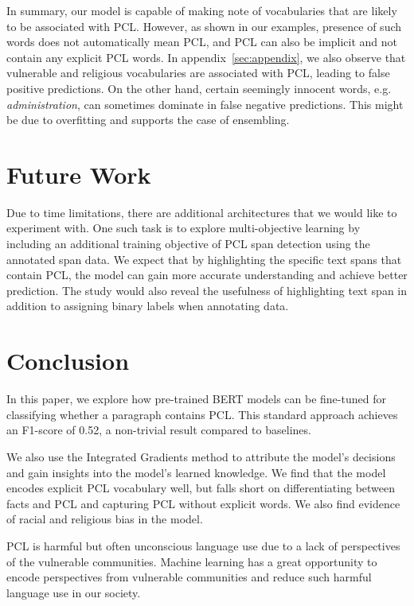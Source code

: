 \documentclass[11pt]{article}
\begin{document}
In summary, our model is capable of making note of vocabularies that are likely to be associated with PCL. However, as shown in our examples, presence of such words does not automatically mean PCL, and PCL can also be implicit and not contain any explicit PCL words. In appendix~\ref{sec:appendix}, we also observe that vulnerable and religious vocabularies are associated with PCL, leading to false positive predictions. On the other hand, certain seemingly innocent words, e.g. \textit{administration}, can sometimes dominate in false negative predictions. This might be due to overfitting and supports the case of ensembling.

\section{Future Work}

Due to time limitations, there are additional architectures that we would like to experiment with. One such task is to explore multi-objective learning by including an additional training objective of PCL span detection using the annotated span data. We expect that by highlighting the specific text spans that contain PCL, the model can gain more accurate understanding and achieve better prediction. The study would also reveal the usefulness of highlighting text span in addition to assigning binary labels when annotating data.

\section{Conclusion}

In this paper, we explore how pre-trained BERT models can be fine-tuned for classifying whether a paragraph contains PCL. This standard approach achieves an F1-score of 0.52, a non-trivial result compared to baselines. 

We also use the Integrated Gradients method to attribute the model’s decisions and gain insights into the model’s learned knowledge. We find that the model encodes explicit PCL vocabulary well, but falls short on differentiating between facts and PCL and capturing PCL without explicit words. We also find evidence of racial and religious bias in the model.

PCL is harmful but often unconscious language use due to a lack of perspectives of the vulnerable communities. Machine learning has a great opportunity to encode perspectives from vulnerable communities and reduce such harmful language use in our society.
\end{document}
